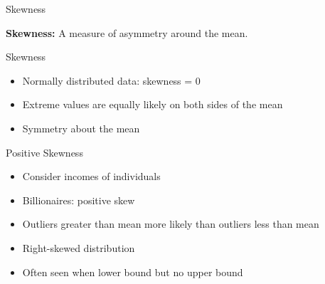 \begin{frame}[t]{Skewness}
	\vfill
	
	\centering
	\textbf{Skewness:} 
	A measure of asymmetry around the mean.

\end{frame}


\begin{frame}[t]{Skewness}
	\begin{itemize}
		\item Normally distributed data: skewness = 0
		\item Extreme values are equally likely on both
		sides of the mean
		\item Symmetry about the mean
	\end{itemize}
\end{frame}



\begin{frame}[t]{Positive Skewness}
	\begin{itemize}
		\item Consider incomes of individuals
		
		\item Billionaires: positive skew
		
		\item Outliers greater than mean more likely
		than outliers less than mean
		\item Right-skewed distribution
		\item Often seen when lower bound but no
		upper bound
		
	\end{itemize}
\end{frame}